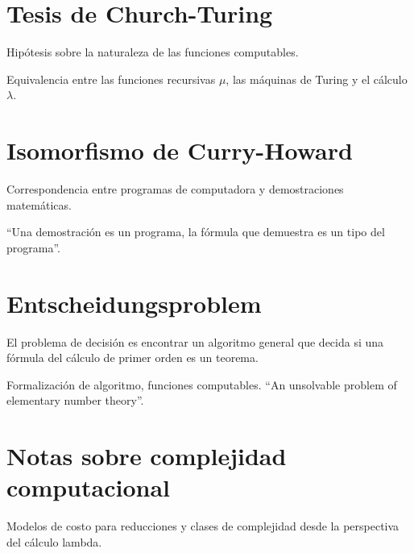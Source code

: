 \section{Tesis de Church-Turing}

Hipótesis sobre la naturaleza de las funciones computables.

Equivalencia entre las funciones recursivas \(\mu\), las máquinas de Turing y el
cálculo \(\lambda\).

\section{Isomorfismo de Curry-Howard}

Correspondencia entre programas de computadora y demostraciones matemáticas.

``Una demostración es un programa, la fórmula que demuestra es un tipo del
programa''.

\section{Entscheidungsproblem}

El problema de decisión es encontrar un algoritmo general que decida si una
fórmula del cálculo de primer orden es un teorema.

Formalización de algoritmo, funciones computables. ``An unsolvable problem of
elementary number theory''.

\section{Notas sobre complejidad computacional}

Modelos de costo para reducciones y clases de complejidad desde la perspectiva
del cálculo lambda.

